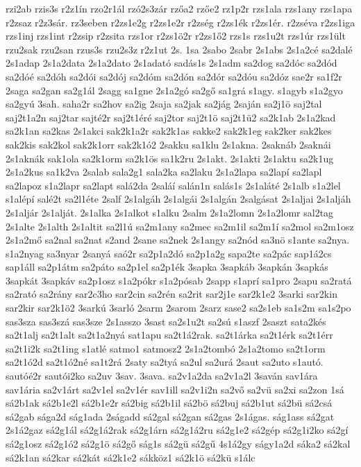 {rzi2ab
rzis3s
r2z1ín
rzo2r1ál
rzó2s3zár
rzőa2
rzőe2
rz1p2r
rzs1ala
rzs1any
rzs1apa
r2zsaz
r2z3sár.
rz3seben
r2zs1e2g
r2zs1e2r
r2zség
r2zs1ék
r2zs1ér.
r2zséva
r2zs1iga
rzs1inj
rzs1int
r2zsip
r2zsita
rzs1or
r2zs1ö2r
r2zs1ő2
rzs1s
rzs1u2t
rzs1úr
rzs1ült
rzu2sak
rzu2san
rzus3s
rzu2s3z
r2z1ut
2s.
1sa
2sabo
2sabr
2s1abs
2s1a2cé
sa2dalé
2s1adap
2s1a2data
2s1a2dato
2s1adató
sadás1s
2s1adm
sa2dog
sa2dóc
sa2dód
sa2dóé
sa2dóh
sa2dói
sa2dój
sa2dóm
sa2dón
sa2dór
sa2dóu
sa2dóz
sae2r
sa1f2r
2saga
sa2gan
sa2g1ál
2sagg
sa1gne
2s1a2gó
sa2gő
sa1grá
s1agy.
s1agyb
s1a2gyo
sa2gyú
3sah.
saha2r
sa2hov
sa2ig
2saja
sa2jak
sa2jág
2saján
sa2j1ö
saj2tal
saj2t1a2n
saj2tar
sajté2r
saj2t1éré
saj2tor
saj2t1ö
saj2t1ü2
sa2k1ab
2s1a2kad
sa2k1an
sa2kas
2s1akci
sak2k1a2r
sak2k1as
sakke2
sak2k1eg
sak2ker
sak2kes
sak2kis
sak2kol
sak2k1orr
sak2k1ó2
2sakku
sa1klu
2s1akna.
2saknáb
2saknái
2s1aknák
sak1ola
sa2k1orm
sa2k1ös
sa1k2ru
2s1akt.
2s1akti
2s1aktu
sa2k1ug
2s1a2kus
sa1k2va
2salab
sala2g1
sala2ka
sa2laku
2s1a2lapa
sa2lapí
sa2lapl
sa2lapoz
s1a2lapr
sa2lapt
salá2da
2saláí
salán1n
salás1s
2s1aláté
2s1alb
s1a2lel
s1alépí
salé2t
sa2l1éte
2salf
2s1algáh
2s1algái
2s1algán
2salgásat
2s1aljai
2s1aljáh
2s1aljár
2s1alját.
2s1alka
2s1alkot
s1alku
2salm
2s1a2lomn
2s1a2lomr
sal2tag
2s1alte
2s1alth
2s1altit
sa2l1ú
sa2m1any
sa2mec
sa2m1il
sa2m1í
sa2mol
sa2m1osz
2s1a2mő
sa2nal
sa2nat
s2and
2sane
sa2nek
2s1angy
sa2nód
sa3nö
s1ante
sa2nya.
s1a2nyag
sa3nyar
2sanyá
saó2r
sa2p1a2dó
sa2p1a2g
sapa2te
sa2pác
sap1á2cs
sap1áll
sa2p1átm
sa2páto
sa2p1el
sa2p1ék
3sapka
3sapkáb
3sapkán
3sapkás
3sapkát
3sapkáv
sa2p1osz
s1a2pókr
s1a2pósab
2sapp
s1aprí
sa1pro
2sapu
sa2ratá
sa2rató
sa2rány
sar2c3ho
sar2cin
sa2rén
sa2rit
sar2j1e
sar2k1e2
3sarki
sar2kin
sar2kir
sar2k1ö2
3sarkú
3sarló
2sarm
2sarom
2sarz
sase2
sa2s1eb
sa1s2m
sa1s2po
sas3sza
sas3szá
sas3sze
2s1asszo
3sast
sa2s1u2t
sa2sú
s1aszf
2saszt
sata2kés
sa2t1alj
sa2t1alt
sa2t1a2nyá
sat1apu
sa2t1á2rak.
sa2t1árka
sa2t1érk
sa2t1érr
sa2t1i2k
sa2t1ing
s1atlé
satmo1
satmosz2
2s1a2tombó
2s1a2tomo
sa2t1orm
sa2t1ó2d
sa2t1ó2né
sa1t2rá
2saty
sa2tyá
sa2ul
sa2urá
2saut
sa2uto
s1autó.
sautóé2r
sautói2ko
sa2uv
3sav.
3sava.
sa2v1a2da
sa2v1a2l
3saván
sav1ára
sav1ária
sa2v1árt
sa2v1el
sa2v1ér
sav1ill
sa2v1i2n
sa2vő
sa2vü
sa2xi
sa2zon
1sá
sá2b1ak
sá2b1e2l
sá2b1e2r
sá2big
sá2b1il
sá2bö
sá2buj
sá2b1ut
sá2bü
sá2csá
sá2gab
sága2d
ság1ada
2ságadd
sá2gal
sá2gan
sá2gas
2s1ágas.
ság1ass
sá2gat
2s1á2gaz
sá2g1ál
sá2g1á2rak
sá2g1árn
sá2g1á2ru
sá2g1e2
sá2gép
sá2g1i2ko
sá2gí
sá2g1osz
sá2g1ó2
sá2g1ö
sá2gő
ság1s
sá2gü
sá2gű
4s1á2gy
ságy1a2d
sáka2
sá2kal
sá2k1an
sá2kar
sá2kát
sá2k1e2
sákköz1
sá2k1ö
sá2kü
s1álc
}

